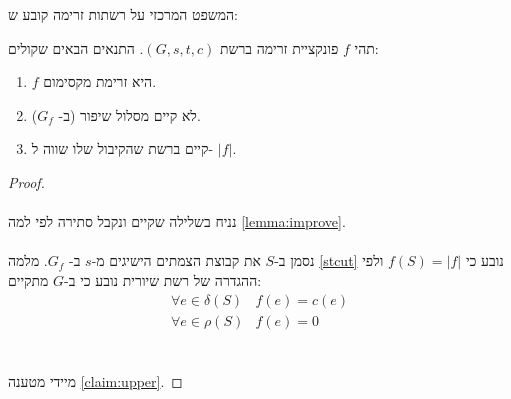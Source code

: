 המשפט המרכזי על רשתות זרימה קובע ש:
\begin{theorem}
\label{theorem:mincutmaxflow}
תהי $f$ פונקציית זרימה ברשת
$(G, s, t, c)$.
התנאים הבאים שקולים:
\begin{enumerate}
\item
$f$
היא זרימת מקסימום.
\item
לא קיים מסלול שיפור (ב-%
$G_f$).
\item
קיים 
\stcut{}
ברשת שהקיבול שלו שווה ל-%
$|f|$.
\end{enumerate}
\end{theorem}

\begin{proof}
$ $
\\
\\
נניח בשלילה שקיים ונקבל סתירה לפי למה
\ref{lemma:improve}.
\\
\\
נסמן ב-$S$ את קבוצת הצמתים הישיגים מ-$s$ ב-%
$G_f$.
מלמה
\ref{stcut}
נובע כי
$f(S) = |f|$
ולפי ההגדרה של רשת שיורית נובע כי ב-$G$ מתקיים:
$$
\begin{array}{ll}
\forall e \in \delta(S) & f(e) = c(e)
\\
\forall e \in \rho(S) & f(e) = 0
\end{array}
$$
\\
\\
מיידי מטענה 
\ref{claim:upper}.
\end{proof}

